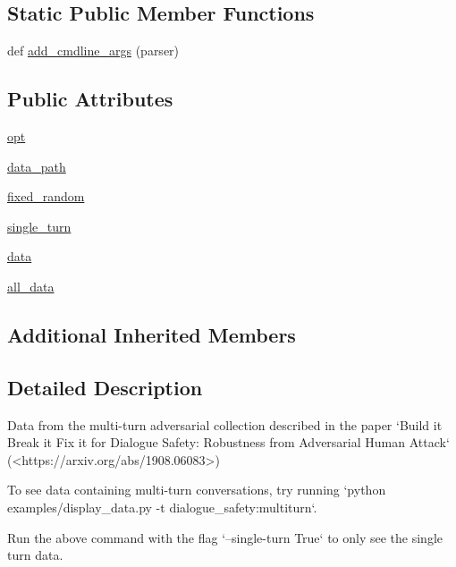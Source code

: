 \subsection*{Static Public Member Functions}
\begin{DoxyCompactItemize}
\item 
def \hyperlink{classparlai_1_1tasks_1_1dialogue__safety_1_1agents_1_1MultiturnTeacher_aa7d5691d1e80f9104f21698b8348b55e}{add\+\_\+cmdline\+\_\+args} (parser)
\end{DoxyCompactItemize}
\subsection*{Public Attributes}
\begin{DoxyCompactItemize}
\item 
\hyperlink{classparlai_1_1tasks_1_1dialogue__safety_1_1agents_1_1MultiturnTeacher_a1e7f1696e4385c96f090de43bbc6333c}{opt}
\item 
\hyperlink{classparlai_1_1tasks_1_1dialogue__safety_1_1agents_1_1MultiturnTeacher_a6ae7a9106d6fbaf0c03f7501975973c6}{data\+\_\+path}
\item 
\hyperlink{classparlai_1_1tasks_1_1dialogue__safety_1_1agents_1_1MultiturnTeacher_a09a1e912d184a8544bfd9b053e05a14d}{fixed\+\_\+random}
\item 
\hyperlink{classparlai_1_1tasks_1_1dialogue__safety_1_1agents_1_1MultiturnTeacher_ae472ac0fed277b530f8e38b33e0eb837}{single\+\_\+turn}
\item 
\hyperlink{classparlai_1_1tasks_1_1dialogue__safety_1_1agents_1_1MultiturnTeacher_ae3535d76dde8df6a43799db8496c1a04}{data}
\item 
\hyperlink{classparlai_1_1tasks_1_1dialogue__safety_1_1agents_1_1MultiturnTeacher_a6a2355fab338fcf40b7eb1b183caa526}{all\+\_\+data}
\end{DoxyCompactItemize}
\subsection*{Additional Inherited Members}


\subsection{Detailed Description}
\begin{DoxyVerb}Data from the multi-turn adversarial collection described in the paper `Build it
Break it Fix it for Dialogue Safety: Robustness from Adversarial Human Attack`
(<https://arxiv.org/abs/1908.06083>)

To see data containing multi-turn conversations, try running
`python examples/display_data.py -t dialogue_safety:multiturn`.

Run the above command with the flag `--single-turn True` to only see the
single turn data.
\end{DoxyVerb}
 

